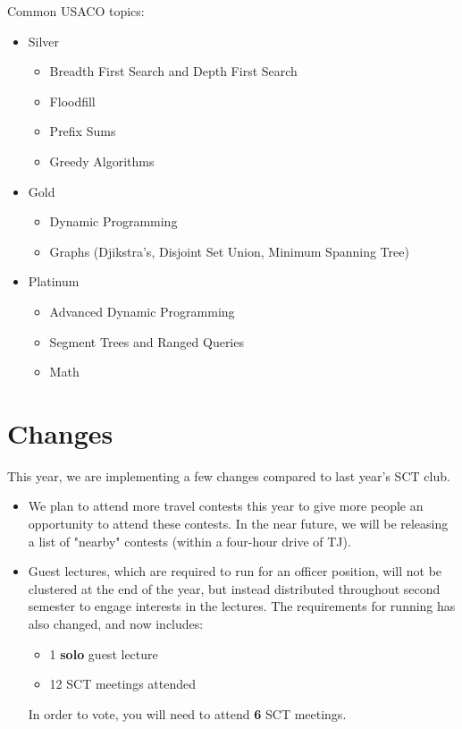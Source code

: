 \documentclass[11pt]{article}
\begin{document}
    Common USACO topics:
    
    \begin{itemize}
    \item Silver
    \begin{itemize}
        \item Breadth First Search and Depth First Search
        \item Floodfill
        \item Prefix Sums
        \item Greedy Algorithms
    \end{itemize}
    \item Gold
    \begin{itemize}
        \item Dynamic Programming
        \item Graphs (Djikstra's, Disjoint Set Union, Minimum Spanning Tree)
    \end{itemize}
    \item Platinum
    \begin{itemize}
        \item Advanced Dynamic Programming
        \item Segment Trees and Ranged Queries
        \item Math
    \end{itemize}
    \end{itemize}

\section{Changes}
    This year, we are implementing a few changes compared to last year's SCT club. 
\begin{itemize}
    \item We plan to attend more travel contests this year to give more people an opportunity to attend these contests. In the near future, we will be releasing a list of "nearby" contests (within a four-hour drive of TJ). 
    \item Guest lectures, which are required to run for an officer position, will not be clustered at the end of the year, but instead distributed throughout second semester to engage interests in the lectures. The requirements for running has also changed, and now includes:
    \begin{itemize}
        \item 1 \textbf{solo} guest lecture
        \item 12 SCT meetings attended
    \end{itemize}
    In order to vote, you will need to attend \textbf{6} SCT meetings.
    \end{itemize}
\end{document}
